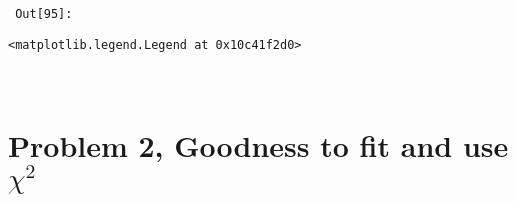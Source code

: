 \documentclass{article}
\newlength{\inputpadding}
\newlength{\cellleftmargin}
\newlength{\smallerfontscale}
\def\smaller{\fontsize{\smallerfontscale}{\smallerfontscale}\selectfont}
\begin{document}
\par\vspace{1\smallerfontscale}%
    
        {\par%
        \vspace{-1\smallerfontscale}%
        \noindent%
        \begin{minipage}{\cellleftmargin}%
    \hfill%
    {\smaller%
    \tt%
    \color{nbframe-out-prompt}%
    Out[95]:}%
    \hspace{\inputpadding}%
    \hspace{0em}%
    \hspace{3pt}%
    \end{minipage}%
        }%
    \begin{addmargin}[\cellleftmargin]{0em}%
    {\smaller%
    \vspace{-1\smallerfontscale}%
    
    
    
    \begin{verbatim}
<matplotlib.legend.Legend at 0x10c41f2d0>
    \end{verbatim}

    
}%
    \end{addmargin}%
    \begin{addmargin}[\cellleftmargin]{0em}%
    {\smaller%
    \vspace{-1\smallerfontscale}%
    
    \begin{center}
    \end{center}
    { \hspace*{\fill} \\}
    }%
    \end{addmargin}%
    \section{Problem 2, Goodness to fit and use
$\chi^2$}\label{problem-2-goodness-to-fit-and-use-chi2}
\end{document}
